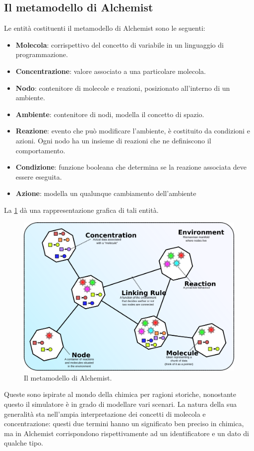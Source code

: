 \documentclass[12pt,a4paper,openright,oneside]{book}
\begin{document}
\subsection{Il metamodello di Alchemist}
Le entità costituenti il metamodello di Alchemist sono le seguenti:
\begin{itemize}
 \item \textbf{Molecola}: corrispettivo del concetto di variabile in un linguaggio di programmazione.
 \item \textbf{Concentrazione}: valore associato a una particolare molecola.
 \item \textbf{Nodo}: contenitore di molecole e reazioni, posizionato all’interno di un ambiente.
 \item \textbf{Ambiente}: contenitore di nodi, modella il concetto di spazio.
 \item \textbf{Reazione}: evento che può modificare l’ambiente, è costituito da condizioni e azioni. Ogni nodo ha un insieme di reazioni che ne definiscono il comportamento.
 \item \textbf{Condizione}: funzione booleana che determina se la reazione associata deve essere eseguita.
 \item \textbf{Azione}: modella un qualunque cambiamento dell’ambiente 
\end{itemize}
La \cref{fig:alchemist-meta-model} dà una rappresentazione grafica di tali entità. 
\begin{figure}
	\centering
	\includegraphics[width=0.8\linewidth]{figures/alchemist-meta-model.png}
	\caption{Il metamodello di Alchemist.}
	\label{fig:alchemist-meta-model}
\end{figure}
Queste sono ispirate al mondo della chimica per ragioni storiche, nonostante questo il simulatore è in grado di modellare vari scenari. La natura della sua generalità sta nell’ampia interpretazione dei concetti di molecola e concentrazione: questi due termini hanno un significato ben preciso in chimica, ma in Alchemist corrispondono rispettivamente ad un identificatore e un dato di qualche tipo.
\end{document}
